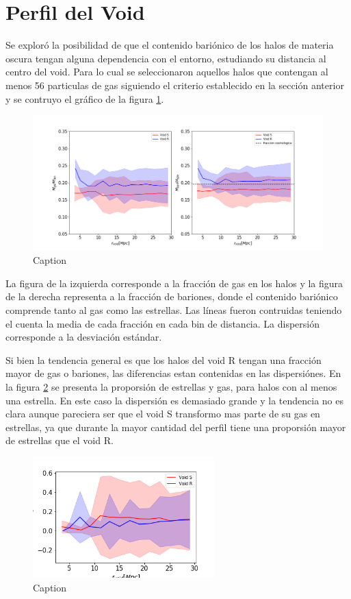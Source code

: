 \section{Perfil del Void }

Se explor\'o la posibilidad de que el contenido bari\'onico de los halos de materia oscura tengan alguna dependencia con el entorno, estudiando su distancia al centro del void. Para lo cual se seleccionaron aquellos halos que contengan al menos 56 particulas de gas siguiendo el criterio establecido en la secci\'on anterior y se contruyo el gr\'afico de la figura \ref{PerfilFracciones}.
\begin{figure}
    \centering
    \includegraphics[width=13cm]{Figures/FraccionPerfil.png}
    \caption{Caption}
    \label{PerfilFracciones}
\end{figure}{}
La figura de la izquierda corresponde a la fracci\'on de gas en los halos y la figura de la derecha representa a la fracci\'on de bariones, donde el contenido bari\'onico comprende tanto al gas como las estrellas. Las l\'ineas fueron contruidas teniendo el cuenta la media de cada fracci\'on en cada bin de distancia. La dispersi\'on corresponde a la desviaci\'on est\'andar. 

Si bien la tendencia general es que los halos del void R tengan una fracci\'on mayor de gas o bariones, las diferencias estan contenidas en las dispersi\'ones. En la figura \ref{PerfilFraccionesBar} se presenta la proporsi\'on de estrellas y gas, para halos con al menos una estrella. En este caso la dispersi\'on es demasiado grande y la tendencia no es clara aunque pareciera ser que el void S transformo mas parte de su gas en estrellas, ya que durante la mayor cantidad del perfil tiene una proporsi\'on mayor de estrellas que el void R.  

\begin{figure}
    \centering
    \includegraphics[width=7cm]{Figures/FraccionPerfil_barionic.png}
    \caption{Caption}
    \label{PerfilFraccionesBar}
\end{figure}{}

